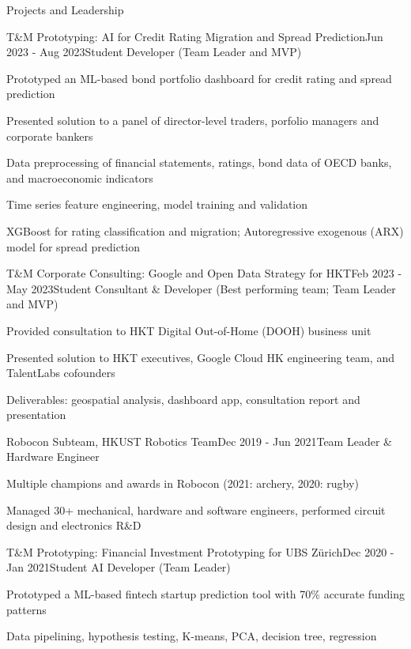 \documentclass{resume}
\begin{document}
\begin{rSection}{Projects and Leadership}
    
    \begin{rSubsection}{T\&M Prototyping: AI for Credit Rating Migration and Spread Prediction}{Jun 2023 - Aug 2023}{Student Developer (Team Leader and MVP)}{}
        \item Prototyped an ML-based bond portfolio dashboard for credit rating and spread prediction 
        \item Presented solution to a panel of director-level traders, porfolio managers and corporate bankers
        \item Data preprocessing of financial statements, ratings, bond data of OECD banks, and macroeconomic indicators
        \item Time series feature engineering, model training and validation
        \item XGBoost for rating classification and migration; Autoregressive exogenous (ARX) model for spread prediction
    \end{rSubsection}
    
    \begin{rSubsection}{T\&M Corporate Consulting: Google and Open Data Strategy for HKT}{Feb 2023 - May 2023}{Student Consultant \& Developer (Best performing team; Team Leader and MVP)}{}
        \item Provided consultation to HKT Digital Out-of-Home (DOOH) business unit
        \item Presented solution to HKT executives, Google Cloud HK engineering team, and TalentLabs cofounders
        \item Deliverables: geospatial analysis, dashboard app, consultation report and presentation
    \end{rSubsection}

    \begin{rSubsection}{Robocon Subteam, HKUST Robotics Team}{Dec 2019 - Jun 2021}{Team Leader \& Hardware Engineer}{}
        \item Multiple champions and awards in Robocon (2021: archery, 2020: rugby)
        \item Managed 30+ mechanical, hardware and software engineers, performed circuit design and electronics R\&D
    \end{rSubsection}

    \begin{rSubsection}{T\&M Prototyping: Financial Investment Prototyping for UBS Zürich}{Dec 2020 - Jan 2021}{Student AI Developer (Team Leader)}{}
        \item Prototyped a ML-based fintech startup prediction tool with 70\% accurate funding patterns
        \item Data pipelining, hypothesis testing, K-means, PCA, decision tree, regression
    \end{rSubsection}

\end{rSection}
\end{document}
